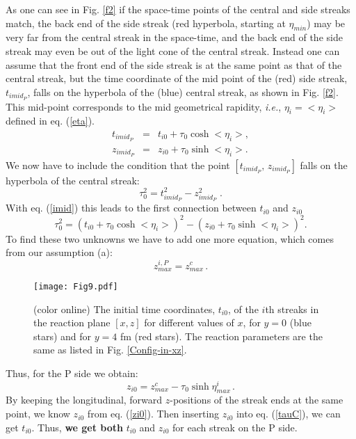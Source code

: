 \documentclass[aps,prc,twocolumn,floatfix,showpacs,a4paper,
nofootinbib,amsmath,amssymb]{revtex4-1}
\newcommand{\be}{\begin{equation}}
\newcommand{\ee}{\end{equation}}
\newcommand{\ba}{\begin{eqnarray}}
\newcommand{\ea}{\end{eqnarray}}
\begin{document}
As one can see in Fig. \ref{f2} if the space-time points of the
central and side streaks match, the back end of the side streak 
(red hyperbola, starting at $\eta_{min}$) 
may be very far from the central streak in the 
space-time,  and 
the back end of the side streak may even be out of the light cone
of the central streak. Instead one can assume that the front end of the
side streak is at the same point as that of the central streak, but
the time coordinate of the mid point of the (red) 
side streak, $t_{imid_P}$, falls
on the hyperbola of the (blue) central streak, as  shown in 
 Fig. \ref{f2}. This mid-point corresponds to the mid geometrical rapidity, {\it i.e.}, $\eta_i=<\eta_i>$ defined in eq. (\ref{eta}).
\ba
t_{imid_P} &=& t_{i0} + \tau_0 \cosh <\eta_i> ,
\nonumber \\
z_{imid_P} &=& z_{i0} + \tau_0 \sinh <\eta_i> . 
\label{imid}
\ea
We now have to include the condition that the point $[t_{imid_P},\, z_{imid_P}]$ falls
on the hyperbola of the central streak:
\be
\tau_0^2 = t_{imid_P}^2 - z_{imid_P}^2\;
\label{tau0}  .
\ee
With eq. (\ref{imid})  this leads to the first connection between $t_{i0}$ and $z_{i0}$
\be
\tau_0^2 = \!\!
\left(t_{i0} {+} {\tau_0} \cosh <\eta_i> \right)^{2} 
- 
\left(z_{i0} {+} {\tau_0} \sinh <\eta_i> \right)^{2} .
\label{tauC}
\ee
To find these two unknowns we have to add one more equation, which comes from our assumption (a):
\be
z_{max}^{i,P} = z_{max}^c\, .
\ee



\begin{figure}[htb]     %
\begin{center}
\resizebox{1.01\columnwidth}{!}
{\texttt{[image: Fig9.pdf]}}
\caption{ (color online)
The initial time coordinates, $t_{i0}$,
of the  $i$th streaks  in the reaction 
plane $[x,z]$ for different values of $x$, for $y=0$
(blue stars) and for $y = 4$ fm (red stars).
The reaction parameters are the same as 
listed in Fig. \ref{Config-in-xz}.
}
\label{t0i}
\end{center}
\end{figure}        %




Thus, for the P side we obtain:
\be
z_{i0} = z_{max}^c - \tau_0 \sinh \eta_{max}^{i}\,.
\label{zi0}
\ee
By keeping the
longitudinal, forward $z$-positions of the streak ends at the same point,
we know $z_{i0}$ from eq. (\ref{zi0}). Then inserting  $z_{i0}$ into 
eq.  (\ref{tauC}), we can get $t_{i0}$. Thus, 
{\bf we get both} $t_{i0}$ and $z_{i0}$ for each streak on the P side.
\end{document}
